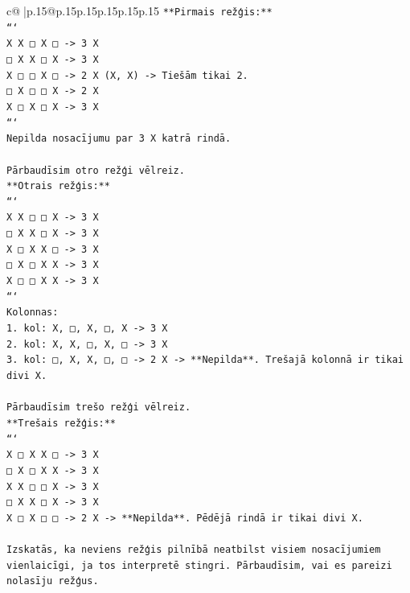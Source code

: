 \documentclass{article}
\begin{document}
{\begin{supertabular}{c@{$\;$}|p{.15\linewidth}@{}p{.15\linewidth}p{.15\linewidth}p{.15\linewidth}p{.15\linewidth}p{.15\linewidth}}
{{{\texttt{**Pirmais režģis:**} \\
\texttt{```} \\
\texttt{X X □ X □  {-}> 3 X} \\
\texttt{□ X X □ X  {-}> 3 X} \\
\texttt{X □ □ X □  {-}> 2 X (X, X) {-}> Tiešām tikai 2.} \\
\texttt{□ X □ □ X  {-}> 2 X} \\
\texttt{X □ X □ X  {-}> 3 X} \\
\texttt{```} \\
\texttt{Nepilda nosacījumu par 3 X katrā rindā.} \\
\\ 
\texttt{Pārbaudīsim otro režģi vēlreiz.} \\
\texttt{**Otrais režģis:**} \\
\texttt{```} \\
\texttt{X X □ □ X  {-}> 3 X} \\
\texttt{□ X X □ X  {-}> 3 X} \\
\texttt{X □ X X □  {-}> 3 X} \\
\texttt{□ X □ X X  {-}> 3 X} \\
\texttt{X □ □ X X  {-}> 3 X} \\
\texttt{```} \\
\texttt{Kolonnas:} \\
\texttt{1. kol: X, □, X, □, X {-}> 3 X} \\
\texttt{2. kol: X, X, □, X, □ {-}> 3 X} \\
\texttt{3. kol: □, X, X, □, □ {-}> 2 X {-}> **Nepilda**. Trešajā kolonnā ir tikai divi X.} \\
\\ 
\texttt{Pārbaudīsim trešo režģi vēlreiz.} \\
\texttt{**Trešais režģis:**} \\
\texttt{```} \\
\texttt{X □ X X □  {-}> 3 X} \\
\texttt{□ X □ X X  {-}> 3 X} \\
\texttt{X X □ □ X  {-}> 3 X} \\
\texttt{□ X X □ X  {-}> 3 X} \\
\texttt{X □ X □ □  {-}> 2 X {-}> **Nepilda**. Pēdējā rindā ir tikai divi X.} \\
\\ 
\texttt{Izskatās, ka neviens režģis pilnībā neatbilst visiem nosacījumiem vienlaicīgi, ja tos interpretē stingri. Pārbaudīsim, vai es pareizi nolasīju režģus.} \\
}}}
\end{supertabular}}
\end{document}
